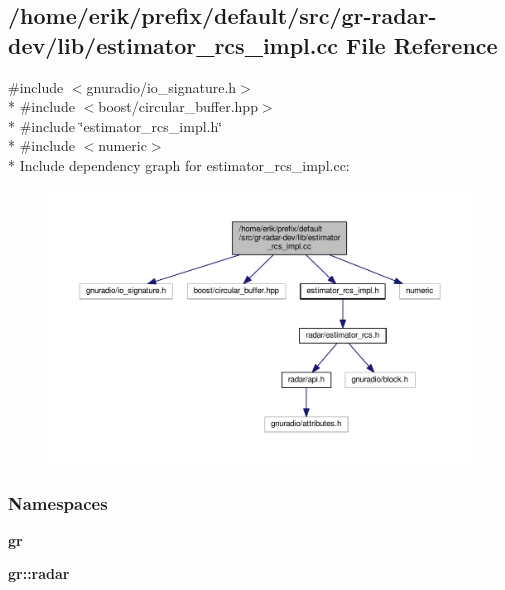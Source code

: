\subsection{/home/erik/prefix/default/src/gr-\/radar-\/dev/lib/estimator\+\_\+rcs\+\_\+impl.cc File Reference}
\label{estimator__rcs__impl_8cc}
{\ttfamily \#include $<$gnuradio/io\+\_\+signature.\+h$>$}\\*
{\ttfamily \#include $<$boost/circular\+\_\+buffer.\+hpp$>$}\\*
{\ttfamily \#include \char`\"{}estimator\+\_\+rcs\+\_\+impl.\+h\char`\"{}}\\*
{\ttfamily \#include $<$numeric$>$}\\*
Include dependency graph for estimator\+\_\+rcs\+\_\+impl.\+cc\+:
\nopagebreak
\begin{figure}[H]
\begin{center}
\leavevmode
\includegraphics[width=350pt]{d6/dab/estimator__rcs__impl_8cc__incl}
\end{center}
\end{figure}
\subsubsection*{Namespaces}
\begin{DoxyCompactItemize}
\item 
 {\bf gr}
\item 
 {\bf gr\+::radar}
\end{DoxyCompactItemize}
